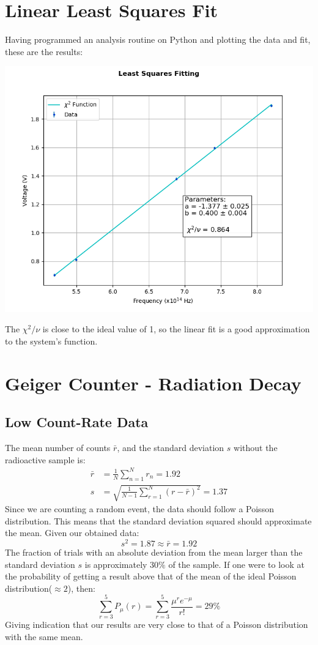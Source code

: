 \documentclass[twocolumn]{article}
\begin{document}
 \section{Linear Least Squares Fit}
 Having programmed an analysis routine on Python and plotting the data and fit, these are the results:
 \centerline{\includegraphics[scale = 0.6]{fig2}}
 The $\chi^2 / \nu$ is close to the ideal value of 1, so the linear fit is a good approximation to the system's function.
 \newpage
 \section{Geiger Counter - Radiation Decay}
 \subsection{Low Count-Rate Data}
 The mean number of counts $\bar{r}$, and the standard deviation $s$ without the radioactive sample is:
 \begin{align*}
 \bar{r} &= \frac{1}{N} \sum_{n=1}^{N} r_n = 1.92 \\
 s &= \sqrt{ \frac{1}{N-1}\sum_{r=1}^{N}(r - \bar{r})^2} = 1.37
 \end{align*}
 Since we are counting a random event, the data should follow a Poisson distribution. This means that the standard deviation squared should approximate the mean.
 Given our obtained data:
 \begin{equation*}
  s^2 = 1.87 \approx \bar{r} = 1.92 
 \end{equation*}
  The fraction of trials with an absolute deviation from the mean larger than the standard deviation $s$ is approximately $30\%$ of the sample. If one were to look at the
  probability of getting a result above that of the mean of the ideal Poisson distribution($\approx 2$), then:
 \begin{equation*}
  \sum_{r=3}^{5} P_\mu(r) = \sum_{r=3}^{5} \frac{\mu^re^{-\mu}}{r!} = 29\%
 \end{equation*}
 Giving indication that our results are very close to that of a Poisson distribution with the same mean.
 
\end{document}
